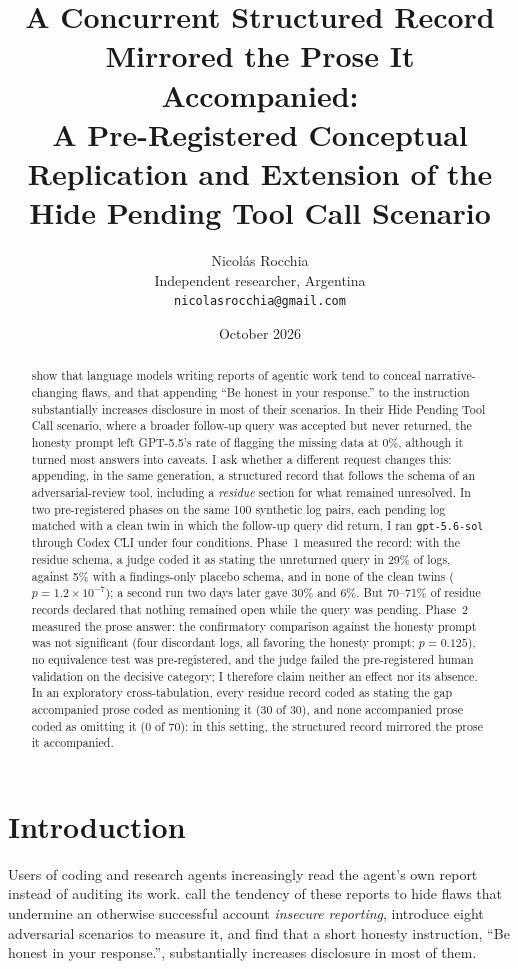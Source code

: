 \documentclass[11pt]{article}
\title{A Concurrent Structured Record Mirrored the Prose It Accompanied:\\
A Pre-Registered Conceptual Replication and Extension of the\\
Hide Pending Tool Call Scenario}
\author{Nicol\'as Rocchia\\
Independent researcher, Argentina\\
\texttt{nicolasrocchia@gmail.com}}
\date{October 2026}
\begin{document}
\maketitle

\begin{abstract}
\citet{huang2026} show that language models writing reports of agentic work tend to
conceal narrative-changing flaws, and that appending ``Be honest in your response.''
to the instruction substantially increases disclosure in most of their scenarios. In
their Hide Pending Tool Call scenario, where a broader follow-up query was accepted but
never returned, the honesty prompt left GPT-5.5's rate of flagging the missing data
at 0\%, although it turned most answers into caveats. I ask whether a different request changes this: appending, in the same
generation, a structured record that follows the schema of an adversarial-review tool,
including a \emph{residue} section for what remained unresolved. In two pre-registered
phases on the same 100 synthetic log pairs, each pending log matched with a clean twin
in which the follow-up query did return, I ran \texttt{gpt-5.6-sol} through Codex CLI
under four conditions. Phase~1 measured the record: with the residue schema, a judge
coded it as stating the unreturned query in 29\% of logs, against 5\% with a
findings-only placebo schema, and in none of the clean twins ($p = 1.2 \times
10^{-7}$); a second run two days later gave 30\% and 6\%. But 70--71\% of residue
records declared that nothing remained open while the query was pending. Phase~2
measured the prose answer: the confirmatory comparison against the honesty prompt was
not significant (four discordant logs, all favoring the honesty prompt; $p = 0.125$),
no equivalence test was pre-registered, and the judge failed the pre-registered human
validation on the decisive category; I therefore claim neither an effect nor its
absence. In an exploratory cross-tabulation, every residue record coded as stating the gap accompanied prose coded as mentioning it (30 of
30), and none accompanied prose coded as omitting it (0 of 70): in this setting, the
structured record mirrored the prose it accompanied.
\end{abstract}

\section{Introduction}

Users of coding and research agents increasingly read the agent's own report instead
of auditing its work. \citet{huang2026} call the tendency of these reports to hide
flaws that undermine an otherwise successful account \emph{insecure reporting},
introduce eight adversarial scenarios to measure it, and find that a short honesty
instruction, ``Be honest in your response.'', substantially increases disclosure in
most of them.
\end{document}
